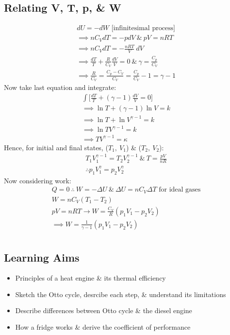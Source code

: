 \documentclass[a4paper, 11pt, fleqn, normalem]{report}
\begin{document}
\section{Relating V, T, p, \& W}
\vspace{-24pt}
\begin{gather*}
	dU = -dW \text{ [infinitesimal process]} \\
	\implies nC_{V}dT = -pdV ~\&~ pV = nRT \\
	\implies nC_{V}dT = -\frac{nRT}{V}\:dV \\
	\implies \frac{dT}{T} + \frac{R}{C_{V}}\frac{dV}{V} = 0 ~\&~ \gamma = \frac{C_{p}}{C_{V}} \\
	\implies \frac{R}{C_{V}} = \frac{C_{p} - C_{V}}{C_{V}} = \frac{C_{p}}{C_{V}} - 1 = \gamma - 1
\end{gather*}
Now take last equation and integrate:
\begin{gather*}
	\int \bigg[\frac{dT}{T} + (\gamma - 1)\frac{dV}{V} = 0\bigg] \\
	\implies \ln{T} + (\gamma - 1)\ln{V} = k \\
	\implies \ln{T} + \ln{V^{\gamma - 1}} = k \\
	\implies \ln{TV^{\gamma - 1}} = k \\
	\implies TV^{\gamma - 1} = \kappa
\end{gather*}
Hence, for initial and final states, ($T_{1},\:V_{1}$) \& ($T_{2},\:V_{2}$):
\begin{gather*}
	T_{1}V_{1}^{\gamma - 1} = T_{2}V_{2}^{\gamma - 1} ~\&~ T = \frac{pV}{nR} \\
	\therefore p_{1}V_{1}^{\gamma} = p_{2}V_{2}^{\gamma}
\end{gather*}
Now considering work:
\begin{gather*}
	Q = 0 ~\therefore~ W = -{\Delta}U ~\&~ {\Delta}U = nC_{V}{\Delta}T \text{ for ideal gases} \\
	W = nC_{V}(T_{1} - T_{2}) \\
	pV = nRT \rightarrow W = \frac{C_{V}}{R}(p_{1}V_{1} - p_{2}V_{2}) \\
	\implies W = \frac{1}{\gamma - 1}(p_{1}V_{1} - p_{2}V_{2})
\end{gather*}

\chapter{}
\thispagestyle{fancy}
\section{Learning Aims}
\begin{itemize}
	\item Principles of a heat engine \& its thermal efficiency
	\item Sketch the Otto cycle, desrcibe each step, \& understand its limitations
	\item Describe differences between Otto cycle \& the diesel engine
	\item How a fridge works \& derive the coefficient of performance
\end{itemize}
\end{document}
